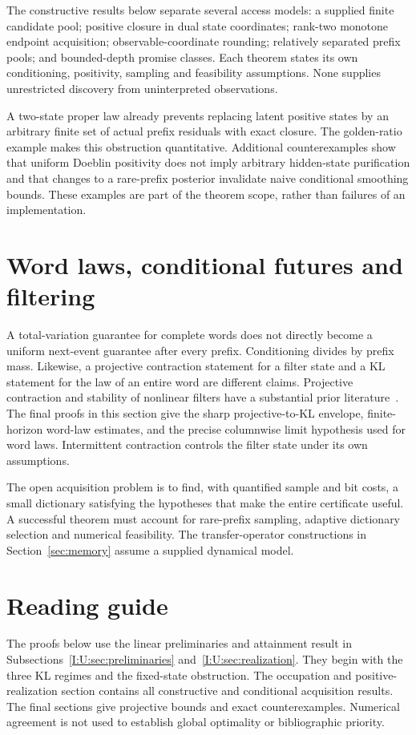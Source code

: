 The constructive results below separate several access models:
a supplied finite candidate pool; positive closure in dual state
coordinates; rank-two monotone endpoint acquisition; observable-coordinate
rounding; relatively separated prefix pools; and bounded-depth promise
classes. Each theorem states its own conditioning, positivity, sampling
and feasibility assumptions. None supplies unrestricted discovery from
uninterpreted observations.

A two-state proper law already prevents replacing latent positive states
by an arbitrary finite set of actual prefix residuals with exact closure.
The golden-ratio example makes this obstruction quantitative. Additional
counterexamples show that uniform Doeblin positivity does not imply
arbitrary hidden-state purification and that changes to a rare-prefix
posterior invalidate naive conditional smoothing bounds. These examples
are part of the theorem scope, rather than failures of an implementation.

\section{Word laws, conditional futures and filtering}
A total-variation guarantee for complete words does not directly become
a uniform next-event guarantee after every prefix. Conditioning divides
by prefix mass. Likewise, a projective contraction statement for a filter
state and a KL statement for the law of an entire word are different
claims. Projective contraction and stability of nonlinear filters have
a substantial prior literature~\citep{cohen,atar}. The final proofs in this section give the sharp projective-to-KL
envelope, finite-horizon word-law estimates, and the precise columnwise
limit hypothesis used for word laws. Intermittent contraction controls the
filter state under its own assumptions.

The open acquisition problem is to find, with quantified sample and bit
costs, a small dictionary satisfying the hypotheses that make the entire
certificate useful. A successful theorem must account for rare-prefix
sampling, adaptive dictionary selection and numerical feasibility. The
transfer-operator constructions in Section~\ref{sec:memory} assume
a supplied dynamical model.

\section{Reading guide}
The proofs below use the linear preliminaries and attainment result in
Subsections~\ref{I:U:sec:preliminaries} and~\ref{I:U:sec:realization}.
They begin with the three KL regimes and the fixed-state obstruction.
The occupation and positive-realization section contains all constructive
and conditional acquisition results. The final sections give projective
bounds and exact counterexamples. Numerical agreement is not used to
establish global optimality or bibliographic priority.
\label{II:II:main-end}

